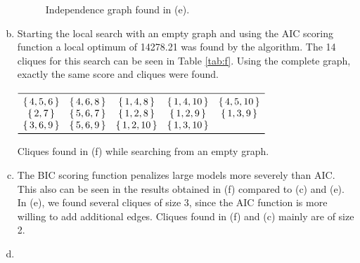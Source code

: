 \documentclass[a4paper,12pt]{scrartcl}
\begin{document}
\begin{enumerate}[(a)]
			\begin{figure}
				\centering
				
				\caption{Independence graph found in (e).}
		        \label{fig:e}
			\end{figure}
		\item Starting the local search with an empty graph and using the AIC scoring function a local optimum of 14278.21 was found by the algorithm. The 14 cliques for this search can be seen in Table \ref{tab:f}. Using the complete graph, exactly the same score and cliques were found.
		    \begin{table}[!htb]
			    \small  
		        \centering
		        $\begin{array}{ *{5}{c} }
		            \midrule
						\set{4,5,6} & \set{4,6,8} & \set{1,4,8} & \set{1,4,10} & \set{4,5,10} \\
						\set{2,7} & \set{5,6,7} & \set{1,2,8} & \set{1,2,9} & \set{1,3,9} \\
						 \set{3,6,9} & \set{5,6,9} & \set{1,2,10} & \set{1,3,10} \\ 
		            \bottomrule
		        \end{array}$
		        \caption{Cliques found in (f) while searching from an empty graph.}
		        \label{tab:f}
			\end{table}

		\item The BIC scoring function penalizes large models more severely than AIC. This also can be seen in the results obtained in (f) compared to (c) and (e). In (e), we found several cliques of size 3, since the AIC function is more willing to add additional edges. Cliques found in (f) and (c) mainly are of size 2. 
		\item 
	\end{enumerate}
\end{document}
